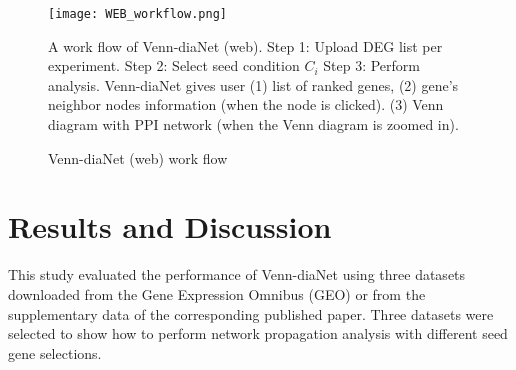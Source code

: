 \documentclass[oneside,phd]{snuthesis}
\begin{document}
\begin{figure*}
\begin{center}
\texttt{[image: WEB\_workflow.png]}
\end{center}
\caption{Venn-diaNet (web) work flow}
\label{web_workflow}
\scriptsize{A work flow of Venn-diaNet (web).
Step 1: Upload DEG list per experiment.
Step 2: Select seed condition $C_i$ 
Step 3: Perform analysis.
Venn-diaNet gives user (1) list of ranked genes, (2) gene's neighbor nodes information (when the node is clicked). (3) Venn diagram with PPI network (when the Venn diagram is zoomed in).}
\end{figure*}

\section{Results and Discussion}

This study evaluated the performance of Venn-diaNet using three datasets downloaded from the Gene Expression Omnibus (GEO) \citep{edgar2002gene} or from the supplementary data of the corresponding published paper. 
Three datasets were selected to show how to perform network propagation analysis with different seed gene selections.
\end{document}
